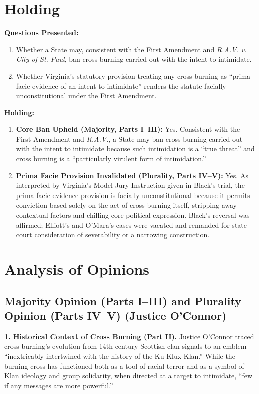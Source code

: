 \documentclass[12pt]{article}
\begin{document}
\section{Holding}
\textbf{Questions Presented:}

\begin{enumerate}
  \item Whether a State may, consistent with the First Amendment and \textit{R.A.V. v. City of St. Paul}, ban cross burning carried out with the intent to intimidate.
  \item Whether Virginia's statutory provision treating any cross burning as ``prima facie evidence of an intent to intimidate'' renders the statute facially unconstitutional under the First Amendment.
\end{enumerate}

\textbf{Holding:}

\begin{enumerate}
  \item \textbf{Core Ban Upheld (Majority, Parts I--III):} Yes. Consistent with the First Amendment and \textit{R.A.V.}, a State may ban cross burning carried out with the intent to intimidate because such intimidation is a ``true threat'' and cross burning is a ``particularly virulent form of intimidation.''
  \item \textbf{Prima Facie Provision Invalidated (Plurality, Parts IV--V):} Yes. As interpreted by Virginia's Model Jury Instruction given in Black's trial, the prima facie evidence provision is facially unconstitutional because it permits conviction based solely on the act of cross burning itself, stripping away contextual factors and chilling core political expression. Black's reversal was affirmed; Elliott's and O'Mara's cases were vacated and remanded for state-court consideration of severability or a narrowing construction.
\end{enumerate}

\section{Analysis of Opinions}
\subsection{Majority Opinion (Parts I--III) and Plurality Opinion (Parts IV--V) (Justice O'Connor)}

\textbf{1. Historical Context of Cross Burning (Part II).} Justice O'Connor traced cross burning's evolution from 14th-century Scottish clan signals to an emblem ``inextricably intertwined with the history of the Ku Klux Klan.'' While the burning cross has functioned both as a tool of racial terror and as a symbol of Klan ideology and group solidarity, when directed at a target to intimidate, ``few if any messages are more powerful.''
\end{document}
